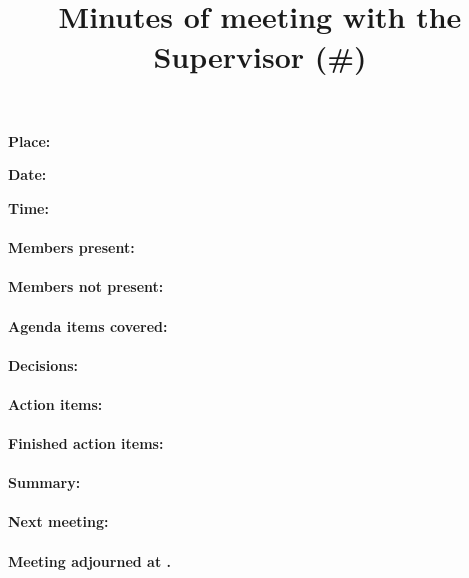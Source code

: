 \documentclass[paper=a4, fontsize=11pt]{article} %
\title{
\horrule{0.5pt} \\[0.4cm] %
\huge Minutes of meeting with the Supervisor (\#\meetingNumber)
\horrule{2pt} \\[-0.9cm] %
}
\newcounter{foocounter}
\begin{document}
\date{}
\maketitle %

\textbf{Place:} \meetingPlace

\textbf{Date:}  \meetingDate

\textbf{Time:}  \meetingTime

\paragraph{Members present:} \membersPresent

\paragraph{Members not present:} \membersMissing

\paragraph{Agenda items covered:} \hspace{0pt}
\setcounter{foocounter}{0}

\paragraph{Decisions:} \hspace{0pt}
\setcounter{foocounter}{0}

\paragraph{Action items:} \hspace{0pt}
\setcounter{foocounter}{0}

\paragraph{Finished action items:} \hspace{0pt}
\setcounter{foocounter}{0}

\paragraph{Summary:} \summary

\paragraph{Next meeting:} \nextMeeting

\paragraph{Meeting adjourned at \meetingEnd.}
\end{document}
